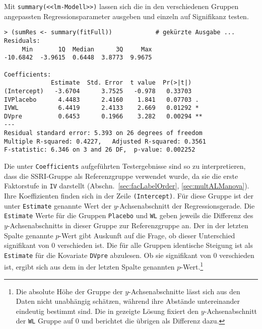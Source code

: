 Mit \lstinline!summary(<<lm-Modell>>)! lassen sich die in den verschiedenen Gruppen angepassten Regressionsparameter ausgeben und einzeln auf Signifikanz testen.
\begin{lstlisting}
> (sumRes <- summary(fitFull))            # gekürzte Ausgabe ...
Residuals:
     Min       1Q  Median      3Q     Max
-10.6842  -3.9615  0.6448  3.8773  9.9675

Coefficients:
             Estimate  Std. Error  t value  Pr(>|t|)
(Intercept)   -3.6704      3.7525   -0.978   0.33703
IVPlacebo      4.4483      2.4160    1.841   0.07703 .
IVWL           6.4419      2.4133    2.669   0.01292 *
DVpre          0.6453      0.1966    3.282   0.00294 **
---
Residual standard error: 5.393 on 26 degrees of freedom
Multiple R-squared: 0.4227,   Adjusted R-squared: 0.3561
F-statistic: 6.346 on 3 and 26 DF,  p-value: 0.002252
\end{lstlisting}

Die unter \lstinline!Coefficients! aufgeführten Testergebnisse sind so zu interpretieren, dass die SSRI-Gruppe als Referenzgruppe verwendet wurde, da sie die erste Faktorstufe in \lstinline!IV! darstellt (Abschn.\ \ref{sec:facLabelOrder}, \ref{sec:multALManova}). Ihre Koeffizienten finden sich in der Zeile \lstinline!(Intercept)!. Für diese Gruppe ist der unter \lstinline!Estimate! genannte Wert der $y$-Achsenabschnitt der Regressionsgerade. Die \lstinline!Estimate! Werte für die Gruppen \lstinline!Placebo! und \lstinline!WL! geben jeweils die Differenz des $y$-Achsenabschnitts in dieser Gruppe zur Referenzgruppe an. Der in der letzten Spalte genannte $p$-Wert gibt Auskunft auf die Frage, ob dieser Unterschied signifikant von $0$ verschieden ist. Die für alle Gruppen identische Steigung ist als \lstinline!Estimate! für die Kovariate \lstinline!DVpre! abzulesen. Ob sie signifikant von $0$ verschieden ist, ergibt sich aus dem in der letzten Spalte genannten $p$-Wert.\footnote{Die absolute Höhe der Gruppe der $y$-Achsenabschnitte lässt sich aus den Daten nicht unabhängig schätzen, während ihre Abstände untereinander eindeutig bestimmt sind. Die in  gezeigte Lösung fixiert den $y$-Achsenabschnitt der \lstinline!WL! Gruppe auf $0$ und berichtet die übrigen als Differenz dazu.}

